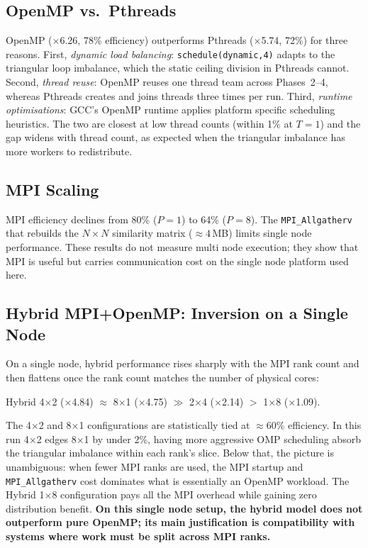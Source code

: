 \documentclass[11pt,a4paper]{article}
\newcommand{\code}[1]{\texttt{\small #1}}
\begin{document}
\subsection{OpenMP vs.\ Pthreads}

OpenMP ($\times$6.26, 78\% efficiency) outperforms Pthreads ($\times$5.74, 72\%)
for three reasons. First, \emph{dynamic load balancing}:
\code{schedule(dynamic,4)} adapts to the triangular loop imbalance, which the
static ceiling division in Pthreads cannot. Second, \emph{thread reuse}: OpenMP
reuses one thread team across Phases~2--4, whereas Pthreads creates and joins
threads three times per run. Third, \emph{runtime optimisations}: GCC's OpenMP
runtime applies platform specific scheduling heuristics. The two are closest at
low thread counts (within 1\% at $T=1$) and the gap widens with thread count, as
expected when the triangular imbalance has more workers to redistribute.

\subsection{MPI Scaling}

MPI efficiency declines from 80\% ($P=1$) to 64\% ($P=8$). The
\code{MPI\_Allgatherv} that rebuilds the $N \times N$ similarity matrix
($\approx 4$\,MB) limits single node performance. These results do not measure
multi node execution; they show that MPI is useful but carries communication
cost on the single node platform used here.

\subsection{Hybrid MPI+OpenMP: Inversion on a Single Node}

On a single node, hybrid performance rises sharply with the MPI rank count and
then flattens once the rank count matches the number of physical cores:
\begin{center}
Hybrid 4$\times$2 ($\times$4.84) $\approx$ 8$\times$1 ($\times$4.75)
$\gg$ 2$\times$4 ($\times$2.14) $>$ 1$\times$8 ($\times$1.09).
\end{center}
The 4$\times$2 and 8$\times$1 configurations are statistically tied at
$\approx$60\% efficiency. In this run 4$\times$2 edges 8$\times$1 by under
2\%, having more aggressive OMP scheduling absorb the triangular imbalance
within each rank's slice. Below that, the picture is unambiguous: when fewer
MPI ranks are used, the MPI startup and \code{MPI\_Allgatherv} cost dominates
what is essentially an OpenMP workload. The Hybrid 1$\times$8 configuration
pays all the MPI overhead while gaining zero distribution benefit.
\textbf{On this single node setup, the hybrid model does not outperform pure
OpenMP; its main justification is compatibility with systems where work must be
split across MPI ranks.}
\end{document}
